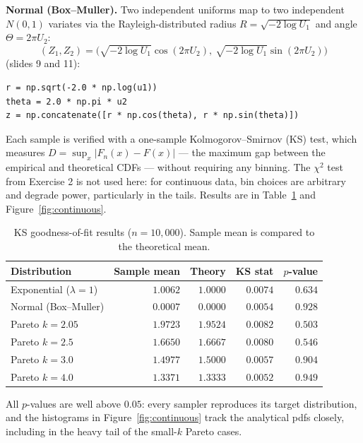 \textbf{Normal (Box--Muller).} Two independent uniforms map to two
independent $N(0,1)$ variates via the Rayleigh-distributed radius
$R = \sqrt{-2\log U_1}$ and angle $\Theta = 2\pi U_2$:
\begin{equation}
    (Z_1, Z_2) = \big(\sqrt{-2\log U_1}\cos(2\pi U_2),\ \sqrt{-2\log U_1}\sin(2\pi U_2)\big)
    \label{eq:boxmuller}
\end{equation}
(slides 9 and 11):
\begin{verbatim}
r = np.sqrt(-2.0 * np.log(u1))
theta = 2.0 * np.pi * u2
z = np.concatenate([r * np.cos(theta), r * np.sin(theta)])
\end{verbatim}

Each sample is verified with a one-sample Kolmogorov--Smirnov (KS) test, which measures $D = \sup_x |F_n(x) - F(x)|$ --- the maximum gap between the empirical and theoretical CDFs --- without requiring any binning. The $\chi^2$ test from Exercise 2 is not used here: for continuous data, bin choices are arbitrary and degrade power, particularly in the tails. Results are in Table~\ref{tab:ks} and Figure~\ref{fig:continuous}.

\begin{table}[h]
    \centering
    \caption{KS goodness-of-fit results ($n = 10{,}000$). Sample mean is
             compared to the theoretical mean.}
    \label{tab:ks}
    \renewcommand{\arraystretch}{1.1}
    \begin{tabular}{lrrrr}
        \toprule
        Distribution & Sample mean & Theory & KS stat & $p$-value \\
        \midrule
        Exponential ($\lambda=1$) & $1.0062$ & $1.0000$ & $0.0074$ & $0.634$ \\
        Normal (Box--Muller)      & $0.0007$ & $0.0000$ & $0.0054$ & $0.928$ \\
        Pareto $k=2.05$           & $1.9723$ & $1.9524$ & $0.0082$ & $0.503$ \\
        Pareto $k=2.5$            & $1.6650$ & $1.6667$ & $0.0080$ & $0.546$ \\
        Pareto $k=3.0$            & $1.4977$ & $1.5000$ & $0.0057$ & $0.904$ \\
        Pareto $k=4.0$            & $1.3371$ & $1.3333$ & $0.0052$ & $0.949$ \\
        \bottomrule
    \end{tabular}
\end{table}

All $p$-values are well above $0.05$: every sampler reproduces its target
distribution, and the histograms in Figure~\ref{fig:continuous} track the
analytical pdfs closely, including in the heavy tail of the small-$k$ Pareto
cases.

